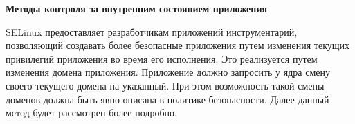 \bigskip
{\bfseries Методы контроля за внутренним 
состоянием приложения} 

SELinux предоставляет разработчикам приложений 
инструментарий, позволяющий создавать более 
безопасные приложения путем изменения текущих
привилегий приложения во время его исполнения. 
Это реализуется путем изменения домена приложения. 
Приложение должно запросить у ядра смену своего 
текущего домена на указанный. При этом возможность
такой смены доменов должна быть явно описана в 
политике безопасности. Далее данный метод будет
рассмотрен более подробно.  
\bigskip

